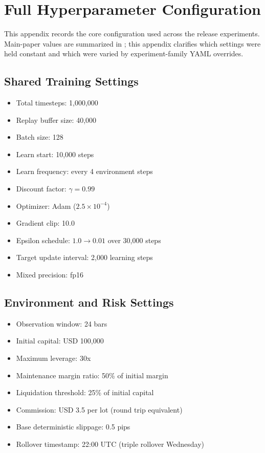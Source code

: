 \section{Full Hyperparameter Configuration}
\label{app:hyperparams}

This appendix records the core configuration used across the release experiments. Main-paper values are summarized in ; this appendix clarifies which settings were held constant and which were varied by experiment-family YAML overrides.

\subsection{Shared Training Settings}
\begin{itemize}[leftmargin=1.4em]
	\item Total timesteps: 1,000,000
	\item Replay buffer size: 40,000
	\item Batch size: 128
	\item Learn start: 10,000 steps
	\item Learn frequency: every 4 environment steps
	\item Discount factor: $\gamma=0.99$
	\item Optimizer: Adam ($2.5\times 10^{-4}$)
	\item Gradient clip: 10.0
	\item Epsilon schedule: $1.0\rightarrow0.01$ over 30,000 steps
	\item Target update interval: 2,000 learning steps
	\item Mixed precision: fp16
\end{itemize}

\subsection{Environment and Risk Settings}
\begin{itemize}[leftmargin=1.4em]
	\item Observation window: 24 bars
	\item Initial capital: USD 100,000
	\item Maximum leverage: 30x
	\item Maintenance margin ratio: 50\% of initial margin
	\item Liquidation threshold: 25\% of initial capital
	\item Commission: USD 3.5 per lot (round trip equivalent)
	\item Base deterministic slippage: 0.5 pips
	\item Rollover timestamp: 22:00 UTC (triple rollover Wednesday)
\end{itemize}

